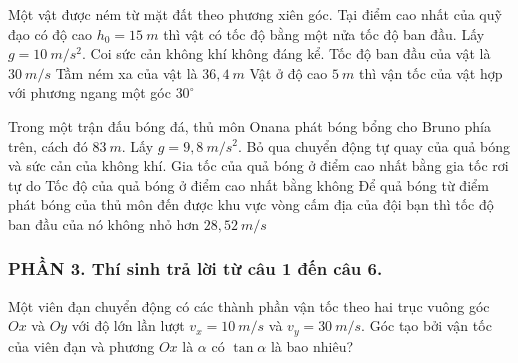 \begin{ex}%
Một vật được ném từ mặt đất theo phương xiên góc. Tại điểm cao nhất của quỹ đạo có  độ cao $h_0=15 \ m$ thì vật có tốc độ bằng một nửa tốc độ ban đầu. Lấy $g=10 \ m/s^2$. Coi sức cản không khí không đáng kể.
{Tốc độ ban đầu của vật là $30 \ m/s$} 
{Tầm ném xa của vật là $36,4 \ m$} 
{Vật ở độ cao $5\ m$ thì vận tốc của vật hợp với phương ngang một góc $30^\circ$} 
\loigiai{}
\end{ex}
\begin{ex}
Trong một trận đấu bóng đá, thủ môn Onana phát bóng bổng cho Bruno phía trên, cách đó $83\ m$. Lấy $g = 9{,}8\ m/s^2$. Bỏ qua chuyển động tự quay của quả bóng và sức cản của không khí. 
{\True Gia tốc của quả bóng ở điểm cao nhất bằng gia tốc rơi tự do}
{Tốc độ của quả bóng ở điểm cao nhất bằng không}
{\True Để quả bóng từ điểm phát bóng của thủ môn đến được khu vực vòng cấm địa của đội bạn thì tốc độ ban đầu của nó không nhỏ hơn $28{,}52\ m/s$}
\end{ex}
\subsubsection*{PHẦN 3. Thí sinh trả lời từ câu 1 đến câu 6.}
\setcounter{ex}{0} 
\begin{ex}
Một viên đạn chuyển động có các thành phần vận tốc theo hai trục vuông góc $Ox$ và $Oy$ với độ lớn lần lượt $v_{x}=10 \ m/s$ và $v_{y}=30 \ m/s$. Góc tạo bởi vận tốc của viên đạn và phương $Ox$ là $\alpha$ có $\tan \alpha$ là bao nhiêu?
\end{ex}



